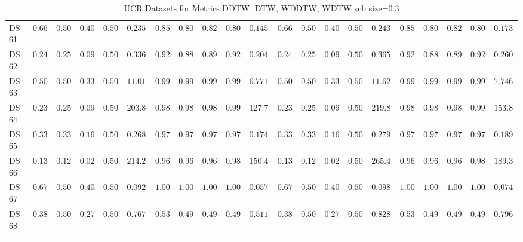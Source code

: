 {\begin{longtable}{|l|ccccc|ccccc|ccccc|ccccc|}
		DS 61 & $0.6667$ & $0.5000$ & $0.4000$ & $0.5000$ & $0.2358$ & $0.8571$ & $0.8036$ & $0.8250$ & $0.8036$ & $\boldsymbol{0.1457}$ & $0.6667$ & $0.5000$ & $0.4000$ & $0.5000$ & $0.2438$ & $0.8571$ & $0.8036$ & $0.8250$ & $0.8036$ & $0.1731$ \\
		DS 62 & $0.2400$ & $0.2500$ & $0.0968$ & $0.5000$ & $0.3366$ & $0.9200$ & $0.8854$ & $0.8969$ & $0.9236$ & $\boldsymbol{0.2047}$ & $0.2400$ & $0.2500$ & $0.0968$ & $0.5000$ & $0.3650$ & $0.9200$ & $0.8854$ & $0.8969$ & $0.9236$ & $0.2602$ \\
		DS 63 & $0.5052$ & $0.5000$ & $0.3356$ & $0.5000$ & $11.0171$ & $0.9966$ & $0.9965$ & $0.9966$ & $0.9965$ & $\boldsymbol{6.7719}$ & $0.5052$ & $0.5000$ & $0.3356$ & $0.5000$ & $11.6291$ & $0.9966$ & $0.9965$ & $0.9966$ & $0.9965$ & $7.7461$ \\
		DS 64 & $0.2376$ & $0.2500$ & $0.0960$ & $0.5000$ & $203.8608$ & $0.9872$ & $0.9871$ & $0.9871$ & $0.9914$ & $\boldsymbol{127.7525}$ & $0.2376$ & $0.2500$ & $0.0960$ & $0.5000$ & $219.8792$ & $0.9872$ & $0.9871$ & $0.9871$ & $0.9914$ & $153.8629$ \\
		DS 65 & $0.3333$ & $0.3333$ & $0.1667$ & $0.5000$ & $0.2688$ & $0.9778$ & $0.9722$ & $0.9748$ & $0.9792$ & $\boldsymbol{0.1745}$ & $0.3333$ & $0.3333$ & $0.1667$ & $0.5000$ & $0.2793$ & $0.9778$ & $0.9722$ & $0.9748$ & $0.9792$ & $0.1897$ \\
		DS 66 & $0.1304$ & $0.1250$ & $0.0288$ & $0.5000$ & $214.2704$ & $0.9661$ & $0.9657$ & $0.9660$ & $0.9804$ & $\boldsymbol{150.4203}$ & $0.1304$ & $0.1250$ & $0.0288$ & $0.5000$ & $265.4179$ & $0.9661$ & $0.9657$ & $0.9660$ & $0.9804$ & $189.3892$ \\
		DS 67 & $0.6786$ & $0.5000$ & $0.4043$ & $0.5000$ & $0.0924$ & $1.0000$ & $1.0000$ & $1.0000$ & $1.0000$ & $\boldsymbol{0.0571}$ & $0.6786$ & $0.5000$ & $0.4043$ & $0.5000$ & $0.0986$ & $\boldsymbol{1.0000}$ & $\boldsymbol{1.0000}$ & $\boldsymbol{1.0000}$ & $\boldsymbol{1.0000}$ & $0.0747$ \\
		DS 68 & $0.3846$ & $0.5000$ & $0.2778$ & $0.5000$ & $0.7670$ & $0.5385$ & $0.4975$ & $0.4953$ & $0.4975$ & $\boldsymbol{0.5119}$ & $0.3846$ & $0.5000$ & $0.2778$ & $0.5000$ & $0.8280$ & $0.5385$ & $0.4975$ & $0.4953$ & $0.4975$ & $0.7969$ \\
		\hline
		\caption{UCR Datasets for Metrics DDTW, DTW, WDDTW, WDTW \gls{scb} size=0.3}
		\label{tab:UCR_ddtw-dtw-wddtw-wdtw_scb_size=0.3}
	\end{longtable}
}
